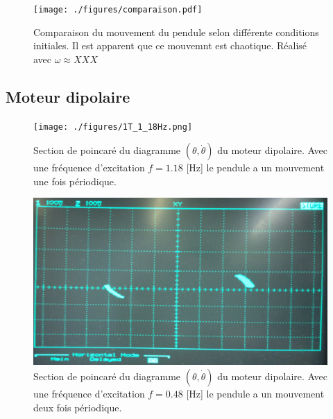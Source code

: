 \documentclass[a4paper,12pt,oneside]{article}
\begin{document}
\begin{figure}[h!]
  \begin{center}
  \texttt{[image: ./figures/comparaison.pdf]}
  \caption{Comparaison du mouvement du pendule selon différente conditions initiales. Il est apparent que ce mouvemnt est chaotique. Réalisé avec $\omega \approx XXX$} \label{fig:comparaison}
  \end{center}
\end{figure}

\subsection{Moteur dipolaire}

\begin{figure}[h!]
  \begin{center}
  \texttt{[image: ./figures/1T\_1\_18Hz.png]}
  \caption{Section de poincaré du diagramme $(\theta,\dot{\theta})$ du moteur dipolaire. Avec une fréquence d'excitation $f=1.18$ [Hz] le pendule a un mouvement une fois périodique.} \label{fig:dipol1T}
  \end{center}
\end{figure}

\begin{figure}[h!]
  \begin{center}
  \includegraphics[width=1.0\linewidth,angle=0]{./figures/2T_0_48Hz.png}
  \caption{Section de poincaré du diagramme $(\theta,\dot{\theta})$ du moteur dipolaire. Avec une fréquence d'excitation $f=0.48$ [Hz] le pendule a un mouvement deux fois périodique.} \label{fig:dipol2T}
  \end{center}
\end{figure}
\end{document}
